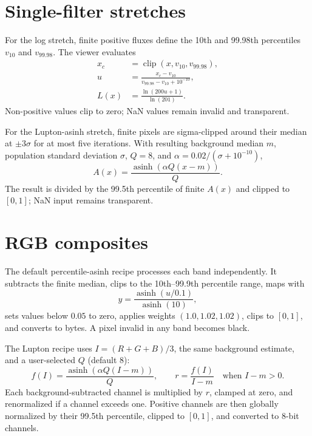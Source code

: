 \documentclass[11pt]{article}
\begin{document}
\section{Single-filter stretches}
For the log stretch, finite positive fluxes define the 10th and 99.98th
percentiles $v_{10}$ and $v_{99.98}$. The viewer evaluates
\begin{align}
 x_c &= \operatorname{clip}(x,v_{10},v_{99.98}),\\
 u &= \frac{x_c-v_{10}}{v_{99.98}-v_{10}+10^{-10}},\\
 L(x) &= \frac{\ln(200u+1)}{\ln(201)}.
\end{align}
Non-positive values clip to zero; NaN values remain invalid and transparent.

For the Lupton-asinh stretch, finite pixels are sigma-clipped around their
median at $\pm3\sigma$ for at most five iterations. With resulting background
median $m$, population standard deviation $\sigma$, $Q=8$, and
$\alpha=0.02/(\sigma+10^{-10})$,
\begin{equation}
 A(x)=\frac{\operatorname{asinh}(\alpha Q(x-m))}{Q}.
\end{equation}
The result is divided by the 99.5th percentile of finite $A(x)$ and clipped
to $[0,1]$; NaN input remains transparent.

\section{RGB composites}
The default percentile-asinh recipe processes each band independently. It
subtracts the finite median, clips to the 10th--99.9th percentile range, maps
with
\begin{equation}
 y=\frac{\operatorname{asinh}(u/0.1)}{\operatorname{asinh}(10)},
\end{equation}
sets values below $0.05$ to zero, applies weights $(1.0,1.02,1.02)$, clips to
$[0,1]$, and converts to bytes. A pixel invalid in any band becomes black.

The Lupton recipe uses $I=(R+G+B)/3$, the same background estimate, and a
user-selected $Q$ (default 8):
\begin{equation}
 f(I)=\frac{\operatorname{asinh}(\alpha Q(I-m))}{Q},\qquad
 r=\frac{f(I)}{I-m}\quad\text{when }I-m>0.
\end{equation}
Each background-subtracted channel is multiplied by $r$, clamped at zero,
and renormalized if a channel exceeds one. Positive channels are then globally
normalized by their 99.5th percentile, clipped to $[0,1]$, and converted to
8-bit channels.
\end{document}
